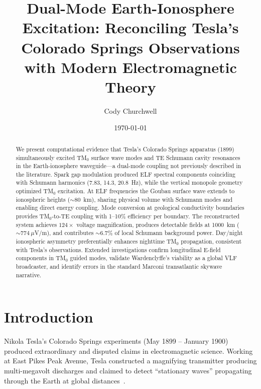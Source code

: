 \documentclass[12pt,preprint,amsmath,amssymb]{revtex4-2}
\begin{document}
\title{Dual-Mode Earth-Ionosphere Excitation: Reconciling Tesla's Colorado Springs Observations with Modern Electromagnetic Theory}

\author{Cody Churchwell}

\date{\today}

\begin{abstract}
We present computational evidence that Tesla's Colorado Springs apparatus (1899) simultaneously excited
TM$_0$ surface wave modes and TE Schumann cavity resonances in the Earth-ionosphere waveguide---a
dual-mode coupling not previously described in the literature. Spark gap modulation produced ELF
spectral components coinciding with Schumann harmonics (7.83, 14.3, 20.8~Hz), while the vertical
monopole geometry optimized TM$_0$ excitation. At ELF frequencies the Goubau surface wave extends to
ionospheric heights (${\sim}80$~km), sharing physical volume with Schumann modes and enabling direct
energy coupling. Mode conversion at geological conductivity boundaries provides TM$_0$-to-TE coupling
with 1--10\% efficiency per boundary. The reconstructed system achieves $124\times$ voltage
magnification, produces detectable fields at 1000~km (${\sim}774~\mu$V/m), and contributes
${\sim}6.7\%$ of local Schumann background power. Day/night ionospheric asymmetry preferentially
enhances nighttime TM$_0$ propagation, consistent with Tesla's observations. Extended investigations
confirm longitudinal E-field components in TM$_0$ guided modes, validate Wardenclyffe's viability as a
global VLF broadcaster, and identify errors in the standard Marconi transatlantic skywave narrative.
\end{abstract}

\maketitle

\section{Introduction}
\label{sec:intro}

Nikola Tesla's Colorado Springs experiments (May 1899 -- January 1900) produced extraordinary and
disputed claims in electromagnetic science. Working at East Pikes Peak Avenue, Tesla constructed a
magnifying transmitter producing multi-megavolt discharges and claimed to detect ``stationary waves''
propagating through the Earth at global distances~\cite{tesla1978,tesla1905}.
\end{document}
